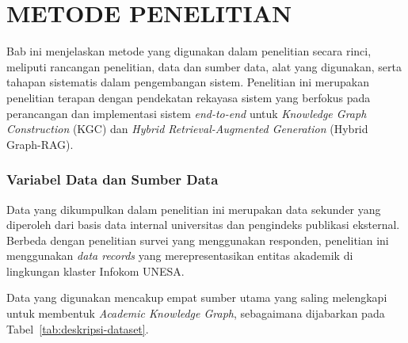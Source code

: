 \chapter{METODE PENELITIAN}

Bab ini menjelaskan metode yang digunakan dalam penelitian secara rinci, meliputi rancangan penelitian, data dan sumber data, alat yang digunakan, serta tahapan sistematis dalam pengembangan sistem. Penelitian ini merupakan penelitian terapan dengan pendekatan rekayasa sistem yang berfokus pada perancangan dan implementasi sistem \textit{end-to-end} untuk \textit{Knowledge Graph Construction} (KGC) dan \textit{Hybrid Retrieval-Augmented Generation} (Hybrid Graph-RAG).

\subsection{Variabel Data dan Sumber Data}
\label{subsec:sumber-data}

Data yang dikumpulkan dalam penelitian ini merupakan data sekunder yang diperoleh dari basis data internal universitas dan pengindeks publikasi eksternal. Berbeda dengan penelitian survei yang menggunakan responden, penelitian ini menggunakan \textit{data records} yang merepresentasikan entitas akademik di lingkungan klaster Infokom UNESA.

Data yang digunakan mencakup empat sumber utama yang saling melengkapi untuk membentuk \textit{Academic Knowledge Graph}, sebagaimana dijabarkan pada Tabel~\ref{tab:deskripsi-dataset}.

